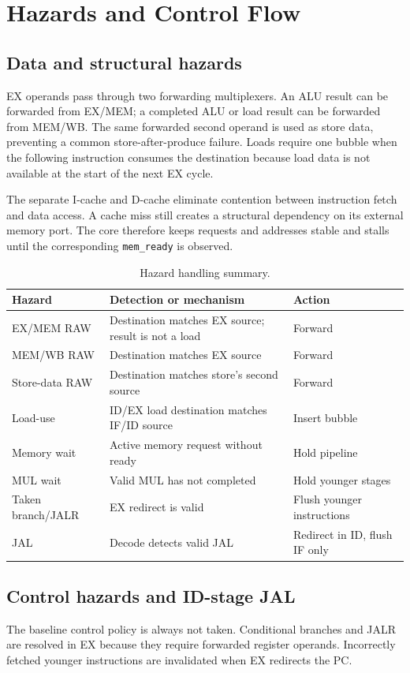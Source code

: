 \documentclass[11pt,a4paper]{article}
\begin{document}
\section{Hazards and Control Flow}

\subsection{Data and structural hazards}
EX operands pass through two forwarding multiplexers.  An ALU result can be
forwarded from EX/MEM; a completed ALU or load result can be forwarded from
MEM/WB.  The same forwarded second operand is used as store data, preventing a
common store-after-produce failure.  Loads require one bubble when the following
instruction consumes the destination because load data is not available at the
start of the next EX cycle.

The separate I-cache and D-cache eliminate contention between instruction fetch
and data access.  A cache miss still creates a structural dependency on its
external memory port.  The core therefore keeps requests and addresses stable
and stalls until the corresponding \texttt{mem\_ready} is observed.

\begin{table}[h]
\centering
\caption{Hazard handling summary.}
\begin{tabularx}{\linewidth}{lXl}
\toprule
Hazard & Detection or mechanism & Action\\
\midrule
EX/MEM RAW & Destination matches EX source; result is not a load & Forward\\
MEM/WB RAW & Destination matches EX source & Forward\\
Store-data RAW & Destination matches store's second source & Forward\\
Load-use & ID/EX load destination matches IF/ID source & Insert bubble\\
Memory wait & Active memory request without ready & Hold pipeline\\
MUL wait & Valid MUL has not completed & Hold younger stages\\
Taken branch/JALR & EX redirect is valid & Flush younger instructions\\
JAL & Decode detects valid JAL & Redirect in ID, flush IF only\\
\bottomrule
\end{tabularx}
\end{table}

\subsection{Control hazards and ID-stage JAL}
The baseline control policy is always not taken.  Conditional branches and
JALR are resolved in EX because they require forwarded register operands.
Incorrectly fetched younger instructions are invalidated when EX redirects the
PC.
\end{document}
